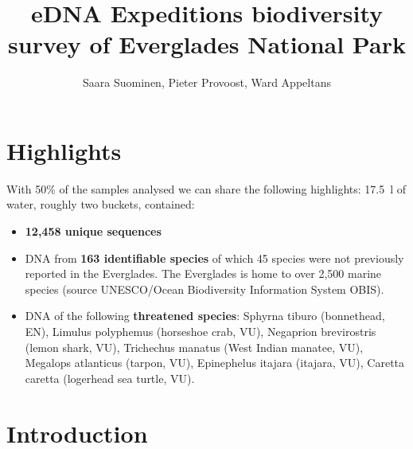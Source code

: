 \documentclass[10pt]{article}
\title{eDNA Expeditions biodiversity survey of Everglades National Park}
\author{Saara Suominen, Pieter Provoost, Ward Appeltans}
\begin{document}

\maketitle

\section*{Highlights}

With 50\% of the samples analysed we can share the following highlights: \SI{17.5}{\litre} of water, roughly two buckets, contained:

\begin{itemize}
\item \textbf{12,458 unique sequences}
\item DNA from \textbf{163 identifiable species} of which 45 species were not previously reported in the Everglades. The Everglades is home to over 2,500 marine species (source UNESCO/Ocean Biodiversity Information System OBIS).
\item DNA of the following \textbf{threatened species}: Sphyrna tiburo (bonnethead, EN), Limulus polyphemus (horseshoe crab, VU), Negaprion brevirostris (lemon shark, VU), Trichechus manatus (West Indian manatee, VU), Megalops atlanticus (tarpon, VU), Epinephelus itajara (itajara, VU), Caretta caretta (logerhead sea turtle, VU).
\end{itemize}

\section*{Introduction}
\end{document}
